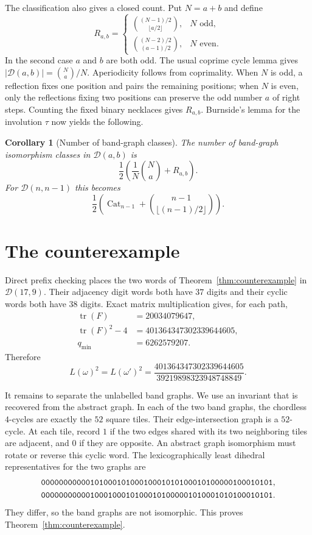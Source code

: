 \documentclass[11pt]{amsart}
\newtheorem{corollary}[theorem]{Corollary}
\theoremstyle{definition}
\newcommand{\cD}{\mathcal D}
\newcommand{\tr}{\operatorname{tr}}
\begin{document}
The classification also gives a closed count.  Put $N=a+b$ and define
\[
 R_{a,b}=\begin{cases}
 \displaystyle\binom{(N-1)/2}{\lfloor a/2\rfloor},&N\text{ odd},\\[8pt]
 \displaystyle\binom{(N-2)/2}{(a-1)/2},&N\text{ even}.
 \end{cases}
\]
In the second case $a$ and $b$ are both odd.  The usual coprime cycle lemma
gives $|\cD(a,b)|=\binom Na/N$.  Aperiodicity follows from coprimality.  When
$N$ is odd, a reflection fixes one position and pairs the remaining positions;
when $N$ is even, only the reflections fixing two positions can preserve the
odd number $a$ of right steps.  Counting the fixed binary necklaces gives
$R_{a,b}$.  Burnside's lemma for the involution $\tau$ now yields the following.

\begin{corollary}[Number of band-graph classes]\label{cor:band-count}
The number of band-graph isomorphism classes in $\cD(a,b)$ is
\[
 \frac12\left(\frac1N\binom Na+R_{a,b}\right).
\]
For $\cD(n,n-1)$ this becomes
\[
 \frac12\left(\operatorname{Cat}_{n-1}
 +\binom{n-1}{\lfloor(n-1)/2\rfloor}\right).
\]
\end{corollary}

\section{The counterexample}\label{sec:counterexample}

Direct prefix checking places the two words of
Theorem~\ref{thm:counterexample} in $\cD(17,9)$.  Their adjacency digit words
both have $37$ digits and their cyclic words both have $38$ digits.  Exact
matrix multiplication gives, for each path,
\begin{align*}
 \tr(F)&=20034079647,\\
 \tr(F)^2-4&=401364347302339644605,\\
 q_{\min}&=6262579207.
\end{align*}
Therefore
\begin{equation}\label{eq:counter-value}
 L(\omega)^2=L(\omega')^2
 =\frac{401364347302339644605}{39219898323948748849}.
\end{equation}

It remains to separate the unlabelled band graphs.  We use an invariant that
is recovered from the abstract graph.  In each of the two band graphs, the
chordless $4$-cycles
are exactly the $52$ square tiles.  Their edge-intersection graph is a
$52$-cycle.  At each tile, record $1$ if the two edges shared with its two
neighboring tiles are adjacent, and $0$ if they are opposite.  An abstract
graph isomorphism must rotate or reverse this cyclic word.  The lexicographically
least dihedral representatives for the two graphs are
\begin{align*}
 &{\tt 0000000000010100010100010001010100010100000100010101},\\
 &{\tt 0000000000010001000101000101000001010001010100010101}.
\end{align*}
They differ, so the band graphs are not isomorphic.  This proves
Theorem~\ref{thm:counterexample}.
\end{document}
